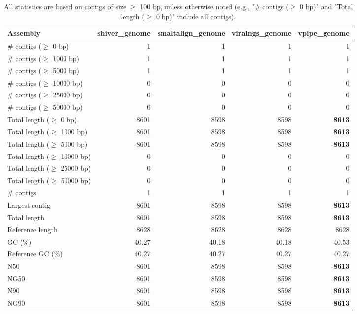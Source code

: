 \documentclass[12pt,a4paper]{article}
\begin{document}
\begin{table}[ht]
\begin{center}
\caption{All statistics are based on contigs of size $\geq$ 100 bp, unless otherwise noted (e.g., "\# contigs ($\geq$ 0 bp)" and "Total length ($\geq$ 0 bp)" include all contigs).}
\begin{tabular}{|l*{4}{|r}|}
\hline
Assembly & shiver\_genome & smaltalign\_genome & viralngs\_genome & vpipe\_genome \\ \hline
\# contigs ($\geq$ 0 bp) & 1 & 1 & 1 & 1 \\ \hline
\# contigs ($\geq$ 1000 bp) & 1 & 1 & 1 & 1 \\ \hline
\# contigs ($\geq$ 5000 bp) & 1 & 1 & 1 & 1 \\ \hline
\# contigs ($\geq$ 10000 bp) & 0 & 0 & 0 & 0 \\ \hline
\# contigs ($\geq$ 25000 bp) & 0 & 0 & 0 & 0 \\ \hline
\# contigs ($\geq$ 50000 bp) & 0 & 0 & 0 & 0 \\ \hline
Total length ($\geq$ 0 bp) & 8601 & 8598 & 8598 & {\bf 8613} \\ \hline
Total length ($\geq$ 1000 bp) & 8601 & 8598 & 8598 & {\bf 8613} \\ \hline
Total length ($\geq$ 5000 bp) & 8601 & 8598 & 8598 & {\bf 8613} \\ \hline
Total length ($\geq$ 10000 bp) & 0 & 0 & 0 & 0 \\ \hline
Total length ($\geq$ 25000 bp) & 0 & 0 & 0 & 0 \\ \hline
Total length ($\geq$ 50000 bp) & 0 & 0 & 0 & 0 \\ \hline
\# contigs & 1 & 1 & 1 & 1 \\ \hline
Largest contig & 8601 & 8598 & 8598 & {\bf 8613} \\ \hline
Total length & 8601 & 8598 & 8598 & {\bf 8613} \\ \hline
Reference length & 8628 & 8628 & 8628 & 8628 \\ \hline
GC (\%) & 40.27 & 40.18 & 40.18 & 40.53 \\ \hline
Reference GC (\%) & 40.27 & 40.27 & 40.27 & 40.27 \\ \hline
N50 & 8601 & 8598 & 8598 & {\bf 8613} \\ \hline
NG50 & 8601 & 8598 & 8598 & {\bf 8613} \\ \hline
N90 & 8601 & 8598 & 8598 & {\bf 8613} \\ \hline
NG90 & 8601 & 8598 & 8598 & {\bf 8613} \\ \hline

\end{tabular}
\end{center}
\end{table}
\end{document}
